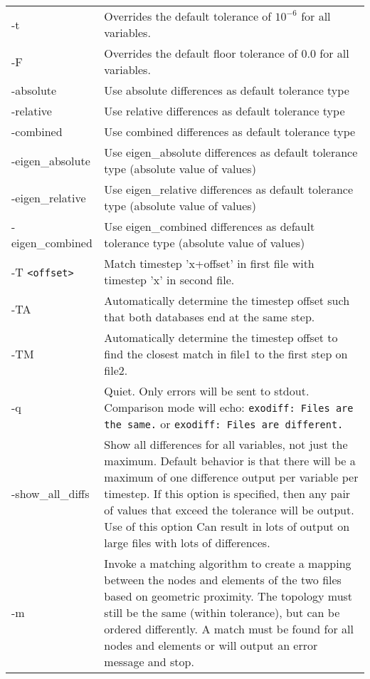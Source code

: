 \renewcommand\arraystretch{1.5}
\begin{longtable}{lp{4.0in}}
-t \tt<real value> & Overrides the default tolerance of $10^{-6}$ for
	all variables.\\
-F \tt<real value> & Overrides the default floor tolerance of 0.0 for
	all variables.\\
-absolute & Use absolute differences as default tolerance type \\
-relative & Use relative differences as default tolerance type \\
-combined & Use combined differences as default tolerance type \\
-eigen\_absolute & Use eigen\_absolute differences as default tolerance type (absolute value of values) \\
-eigen\_relative & Use eigen\_relative differences as default tolerance type (absolute value of values) \\
-eigen\_combined & Use eigen\_combined differences as default tolerance type (absolute value of values) \\

-T \tt<offset> & Match timestep 'x+offset' in first file with timestep
	'x' in second file. \\

-TA   & Automatically determine the timestep offset such that both databases end at the same step. \\
-TM   & Automatically determine the timestep offset to find the closest match in file1 to the first step on file2.\\
-q    & Quiet.  Only errors will be sent to stdout. Comparison mode
	will echo: {\tt exodiff: Files are the same.} or {\tt exodiff: Files are different.}\\

-show\_all\_diffs & Show all differences for all variables, not
	just the maximum.  Default behavior is that there will be a maximum of
	one difference output per variable per timestep.  If this option is
	specified, then any pair of values that exceed the tolerance will be
	output.  Use of this option Can result in lots of output on large files 
        with lots of differences.\\

-m & Invoke a matching algorithm to create a mapping between the
	nodes and elements of the two files based on geometric proximity.  
	The topology must still be the same (within tolerance), but can be ordered differently. 
	A match must be found for all nodes and elements or \exodiff{}
	will output an error message and stop.\\


\end{longtable}
